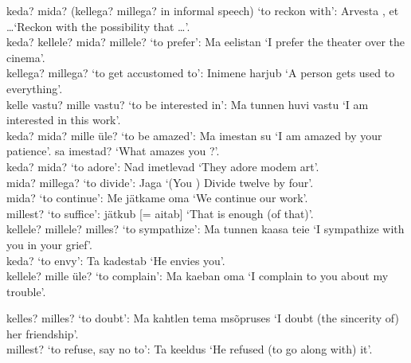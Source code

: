  keda? mida? (kellega? millega? in informal speech) `to reckon with': Arvesta , et \dots `Reckon with the possibility that \dots'. \\

 keda? kellele? mida? millele? `to prefer': Ma eelistan  `I prefer the theater over the cinema'. \\

 kellega? millega? `to get accustomed to': Inimene harjub  `A person gets used to everything'. \\

 kelle vastu? mille vastu? `to be interested in': Ma tunnen huvi  vastu `I am interested in this work'. \\

 keda? mida? mille üle? `to be amazed': Ma imestan su  `I am amazed by your \sing patience'.  sa imestad? `What amazes you \sing?'. \\

 keda? mida? `to adore': Nad imetlevad  `They adore modem art'. \\

 mida? millega? `to divide': Jaga  `(You \sing) Divide twelve by four'. \\

 mida? `to continue': Me jätkame oma  `We continue our work'. \\

 millest? `to suffice':  jätkub [= aitab] `That is enough (of that)'. \\

 kellele? millele? milles? `to sympathize': Ma tunnen  kaasa teie  `I sympathize with you \pl in your grief'. \\

 keda? `to envy': Ta kadestab  `He envies you'. \\

 kellele? mille üle? `to complain': Ma kaeban  oma  `I complain to you \sing about my trouble'.

 kelles? milles? `to doubt': Ma kahtlen tema m{sõpruses} `I doubt (the sincerity of) her friendship'. \\

 millest? `to refuse, say no to': Ta keeldus  `He refused (to go along with) it'. \\

